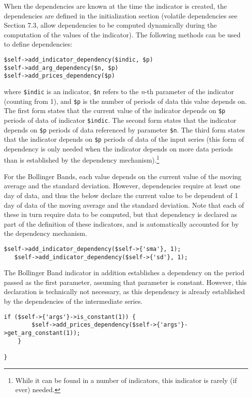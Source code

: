 \documentclass[11pt,twoside]{article}
\begin{document}
When the dependencies are known at the time the indicator is created,
the dependencies are defined in the initialization section (volatile
dependencies see Section 7.3, allow dependencies to be computed
dynamically during the computation of the values of the indicator). The
following methods can be used to define dependencies:
\begin{lstlisting}[numbers=none]
$self->add_indicator_dependency($indic, $p)
$self->add_arg_dependency($n, $p)
$self->add_prices_dependency($p)
\end{lstlisting}

where \lstinline!$indic! is an indicator,
\lstinline!$n! refers to the \textit{n}-th parameter of the
indicator (counting from 1), and \lstinline!$p! is the number
of periods of data this value depends on. The first form states that
the current value of the indicator depends on \lstinline!$p!
periods of data of indicator \lstinline!$indic!. The second
form states that the indicator depends on \lstinline!$p!
periods of data referenced by parameter \lstinline!$n!. The
third form states that the indicator depends on \lstinline!$p!
periods of data of the input series (this form of dependency is only
needed when the indicator depends on more data periods than is
established by the dependency mechanism).\footnote{While it can be
found in a number of indicators, this indicator is rarely (if ever)
needed.}

For the Bollinger Bands, each value depends on the current value of the
moving average and the standard deviation. However, dependencies
require at least one day of data, and thus the below declare the
current value to be dependent of 1 day of data of the moving average
and the standard deviation. Note that each of these in turn require
data to be computed, but that dependency is declared as part of the
definition of these indicators, and is automatically accounted for by
the dependency mechanism.

\begin{lstlisting}[name=example]
   $self->add_indicator_dependency($self->{'sma'}, 1);
   $self->add_indicator_dependency($self->{'sd'}, 1);
\end{lstlisting}
The Bollinger Band indicator in addition establishes a dependency on the
period passed as the first parameter, assuming that parameter is
constant. However, this declaration is technically not necessary, as
this dependency is already established by the dependencies of the
intermediate series.

\begin{lstlisting}[name=example]
    if ($self->{'args'}->is_constant(1)) {
        $self->add_prices_dependency($self->{'args'}->get_arg_constant(1));
    }

}
\end{lstlisting}
\end{document}
